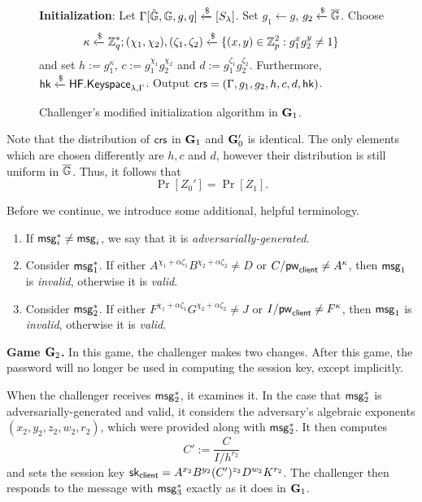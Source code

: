\begin{figure}[h]
	\begin{framed}\small
		\textbf{Initialization}: Let $\Gamma[\hat{\mathbb{G}},\mathbb{G},g,q]\xleftarrow{\$}[S_\lambda]$. Set $g_1\gets g$, $g_2\xleftarrow{\$}\overline{\mathbb{G}}$. Choose $$\kappa\xleftarrow{\$}\mathbb{Z}_q^{*}; (\chi_1,\chi_2),(\zeta_1,\zeta_2)\xleftarrow{\$}\{(x,y)\in\mathbb{Z}_p^2:g_1^xg_2^y\neq 1\}$$ and set $h:=g_1^\kappa$, $c:=g_1^{\chi_1}g_2^{\chi_2}$ and $d:=g_1^{\zeta_1}g_2^{\zeta_2}$. Furthermore, $\mathsf{hk}\xleftarrow{\$}\mathsf{HF.Keyspace}_{\lambda,\Gamma}$. Output $\mathsf{crs} = (\Gamma,g_1, g_2,h,c,d,\mathsf{hk})$.
	\end{framed}
	\caption{Challenger's modified initialization algorithm in $\mathbf{G}_1$.}
	\label{fig:initialization-game-1}
\end{figure}

Note that the distribution of $\mathsf{crs}$ in $\mathbf{G}_1$ and $\mathbf{G}_0'$ is identical. The only elements which are chosen differently are $h, c$ and $d$, however their distribution is still uniform in $\overline{\mathbb{G}}$. Thus, it follows that $$\Pr[Z_0'] = \Pr[Z_1].$$

Before we continue, we introduce some additional, helpful terminology. 

\begin{enumerate}
	\item If $\mathsf{msg}_{i}^{*}\neq\mathsf{msg}_{i}$, we say that it is \textit{adversarially-generated}.
	\item Consider $\mathsf{msg}_{1}^{*}$. If either $A^{\chi_1+\alpha\zeta_1}B^{\chi_2+\alpha\zeta_2}\neq D$ or $C/\mathsf{pw}_{\mathsf{client}}\neq A^\kappa$, then $\mathsf{msg}_{1}$ is \textit{invalid}, otherwise it is \textit{valid}.
	\item Consider $\mathsf{msg}_{2}^{*}$. If either $F^{\chi_1+\alpha\zeta_1}G^{\chi_2+\alpha\zeta_2}\neq J$ or $I/\mathsf{pw}_{\mathsf{client}}\neq F^\kappa$, then $\mathsf{msg}_{1}$ is \textit{invalid}, otherwise it is \textit{valid}.
\end{enumerate}

\textbf{Game $\mathbf{G}_2$.} In this game, the challenger makes two changes. After this game, the password will no longer be used in computing the session key, except implicitly.

When the challenger receives $\mathsf{msg}_{2}^{*}$, it examines it. In the case that $\mathsf{msg}_{2}^{*}$ is adversarially-generated and valid, it considers the adversary's algebraic exponents $(x_2,y_2,z_2,w_2,r_2)$, which were provided along with $\mathsf{msg}_{2}^{*}$. It then computes $$C':= \frac{C}{I/h^{r_2}}$$ and sets the session key $\mathsf{sk}_{\mathsf{client}} = A^{x_2}B^{y_2}(C')^{z_2}D^{w_2}K^{r_2}$. The challenger then responds to the message with $\mathsf{msg}_{3}^{*}$ exactly as it does in $\mathbf{G}_1$. 

